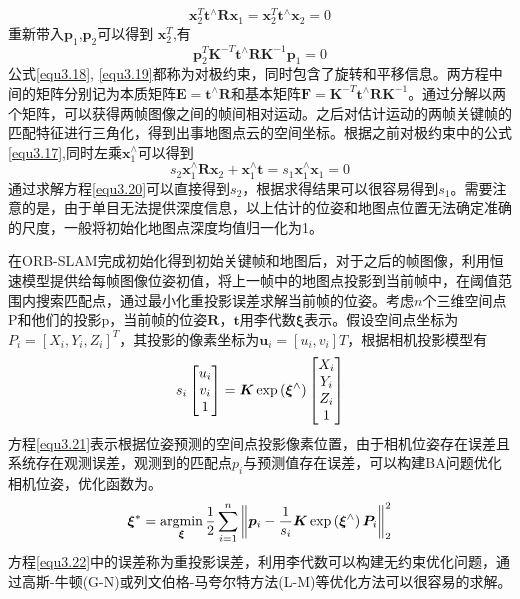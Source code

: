 \begin{equation}
\label{equ3.18}
\boldsymbol{x}_2^T  \boldsymbol{t}^{\wedge}  \boldsymbol{R} \boldsymbol{x}_1 = \boldsymbol{x}_2^T \boldsymbol{t}^{\wedge} \boldsymbol{x}_2 = 0
\end{equation}
重新带入$\boldsymbol{p}_1$,$\boldsymbol{p}_2$可以得到
$\boldsymbol{x}_2^T$,有
\begin{equation}
\label{equ3.19}
\boldsymbol{p}_2^T \boldsymbol{K}^{-T} \boldsymbol{t}^{\wedge}  \boldsymbol{R} \boldsymbol{K}^{-1} \boldsymbol{p}_1  = 0
\end{equation}
公式\eqref{equ3.18}, \eqref{equ3.19}都称为对极约束，同时包含了旋转和平移信息。两方程中间的矩阵分别记为本质矩阵$\boldsymbol{E} = \boldsymbol{t}^{\wedge}  \boldsymbol{R} $和基本矩阵$\boldsymbol{F} = \boldsymbol{K}^{-T} \boldsymbol{t}^{\wedge}  \boldsymbol{R} \boldsymbol{K}^{-1}$。通过分解以两个矩阵，可以获得两帧图像之间的帧间相对运动。之后对估计运动的两帧关键帧的匹配特征进行三角化，得到出事地图点云的空间坐标。根据之前对极约束中的公式\eqref{equ3.17},同时左乘$\boldsymbol{x}_1^{\wedge}$可以得到
\begin{equation}
\label{equ3.20}
s_2 \boldsymbol{x}_1^{\wedge} \boldsymbol{R} \boldsymbol{x}_2 + \boldsymbol{x}_1^{\wedge} \boldsymbol{t} = s_1 \boldsymbol{x}_1^{\wedge} \boldsymbol{x}_1 = 0
\end{equation}
通过求解方程\eqref{equ3.20}可以直接得到$s_2$，根据求得结果可以很容易得到$s_1$。需要注意的是，由于单目无法提供深度信息，以上估计的位姿和地图点位置无法确定准确的尺度，一般将初始化地图点深度均值归一化为1。

在ORB-SLAM完成初始化得到初始关键帧和地图后，对于之后的帧图像，利用恒速模型提供给每帧图像位姿初值，将上一帧中的地图点投影到当前帧中，在阈值范围内搜索匹配点，通过最小化重投影误差求解当前帧的位姿。考虑$n$个三维空间点P和他们的投影p，当前帧的位姿$\boldsymbol{R}$，$\boldsymbol{t}$用李代数$\boldsymbol{\xi}$表示。假设空间点坐标为$P_i=[X_i,Y_i,Z_i]^T$，其投影的像素坐标为$\boldsymbol{u}_i = [u_i,v_i]T$，根据相机投影模型有
\begin{equation}
\label{equ3.21}
s_i
\begin{bmatrix}
u_i \cr v_i \cr 1\cr 
\end{bmatrix}
=
\boldsymbol{K} \exp\left( \boldsymbol{\xi}^{\wedge} \right)
\begin{bmatrix}
X_i \cr Y_i \cr Z_i \cr 1 \cr
\end{bmatrix}
\end{equation}
方程\eqref{equ3.21}表示根据位姿预测的空间点投影像素位置，由于相机位姿存在误差且系统存在观测误差，观测到的匹配点$p_i$与预测值存在误差，可以构建BA问题优化相机位姿，优化函数为。
\begin{equation}
\label{equ3.22}
\boldsymbol{\xi}^* = \operatorname*{argmin}\limits_{\boldsymbol{\xi}} {1 \over 2} \sum\limits_{i=1}^n  \left \Vert \boldsymbol{p}_i - {1 \over s_i} \boldsymbol{K} \exp\left( \boldsymbol{\xi}^{\wedge} \right) \boldsymbol{P}_i  \right \Vert_2^2
\end{equation}
方程\eqref{equ3.22}中的误差称为重投影误差，利用李代数可以构建无约束优化问题，通过高斯-牛顿(G-N)或列文伯格-马夸尔特方法(L-M)等优化方法可以很容易的求解。

